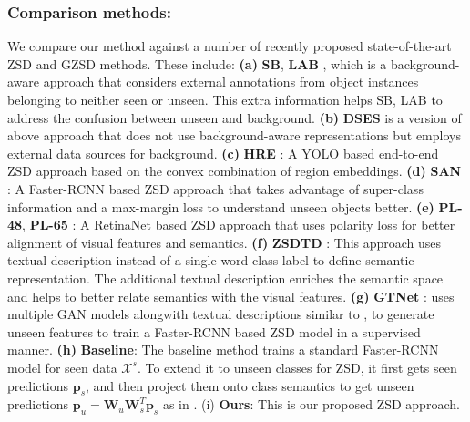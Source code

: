 \documentclass[runningheads]{llncs}
\begin{document}
\subsubsection{Comparison methods:} We compare our method against a number of recently proposed state-of-the-art ZSD and GZSD methods. These include: \textbf{(a)} \textbf{SB}, \textbf{LAB} \cite{bansal2018zero}, which is a background-aware approach that considers external annotations from object instances belonging to neither seen or unseen. This extra information helps SB, LAB \cite{bansal2018zero} to address the confusion between unseen and background. \textbf{(b)} \textbf{DSES} \cite{bansal2018zero} is a version of above approach that does not use background-aware representations but employs external data sources for background. \textbf{(c)} \textbf{HRE} \cite{demirel2018zero}: A YOLO based end-to-end ZSD approach based on the convex combination of region embeddings. \textbf{(d)} \textbf{SAN} \cite{rahman2018zero}: A Faster-RCNN based ZSD approach that takes advantage of super-class information and a max-margin loss to understand unseen objects better. \textbf{(e)} \textbf{PL-48}, \textbf{PL-65} \cite{rahman2018polarity}: A RetinaNet based ZSD approach that uses polarity loss for better alignment of visual features and semantics. \textbf{(f)} \textbf{ZSDTD} \cite{li2019zero}: This approach uses textual description instead of a single-word class-label to define semantic representation. The additional textual description enriches the semantic space and helps to better relate semantics with the visual features. \textbf{(g)} \textbf{GTNet} \cite{zhao2020gtnet}: uses multiple GAN models alongwith textual descriptions similar to \cite{li2019zero}, to generate unseen features to train a Faster-RCNN based ZSD model in a supervised manner. \textbf{(h)} \textbf{Baseline}: The baseline method trains a standard Faster-RCNN model for seen data $\mathcal{X}^s$. To extend it to unseen classes for ZSD, it first gets seen predictions $\mathbf{p}_s$, and then project them onto class semantics to get unseen predictions $\mathbf{p}_u = \mathbf{W}_u\mathbf{W}_s^{T}\mathbf{p}_s$ as in \cite{rahman2018polarity}. (i) \textbf{Ours}: This is our proposed ZSD approach. 
\end{document}
